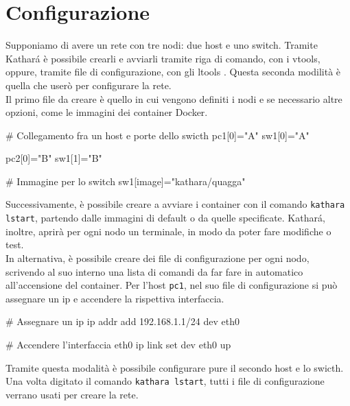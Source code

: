 \section{Configurazione}
Supponiamo di avere un rete con tre nodi: due host e uno switch. Tramite Kathará è possibile crearli e avviarli tramite riga di comando, con i vtools, oppure, tramite file di configurazione, con gli ltools \cite{8406267}.
Questa seconda modilità è quella che userò per configurare la rete.\\
\vspace*{0.01\textheight}
Il primo file da creare è quello in cui vengono definiti i nodi e se necessario altre opzioni, come le immagini dei container Docker. 
\begin{kathara}
  # Collegamento fra un host e porte dello swicth
  pc1[0]="A"
  sw1[0]="A"

  pc2[0]="B"
  sw1[1]="B"

  # Immagine per lo switch
  sw1[image]="kathara/quagga"
\end{kathara}
Successivamente, è possibile creare a avviare i container con il comando \texttt{kathara lstart}, partendo dalle immagini di default o da quelle specificate. 
Kathará, inoltre, aprirà per ogni nodo un terminale, in modo da poter fare modifiche o test. \\
\vspace*{0.01\textheight}
In alternativa, è possibile creare dei file di configurazione per ogni nodo, scrivendo al suo interno una lista di comandi da far fare in automatico all'accensione del container.
Per l'host \texttt{pc1}, nel suo file di configurazione si può assegnare un ip e accendere la rispettiva interfaccia.
\begin{kathara}[pc1.startup]
  # Assegnare un ip
  ip addr add 192.168.1.1/24 dev eth0

  # Accendere l'interfaccia eth0
  ip link set dev eth0 up
\end{kathara}
Tramite questa modalità è possibile configurare pure il secondo host e lo swicth. Una volta digitato il comando \texttt{kathara lstart}, tutti i file di configurazione verrano usati per creare la rete.

